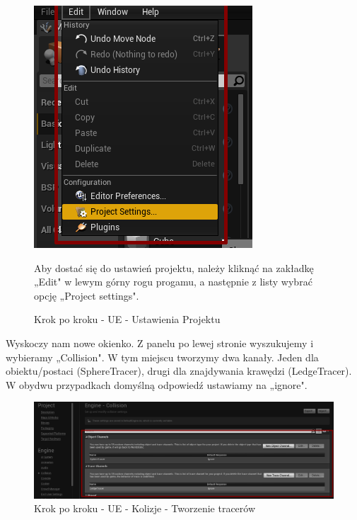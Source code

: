 \documentclass[openright]{xmgr}
\begin{document}
\begin{figure}[!htb]
    \begin{center}
    \includegraphics[scale=0.5]{Screeny/UeKrokPoKroku/UE-Climb-ProjectSettings.png}
    \end{center}
    \caption{Krok po kroku - UE - Ustawienia Projektu}
    Aby dostać się do ustawień projektu, należy kliknąć na zakładkę „Edit" w lewym górny rogu progamu, a następnie z listy wybrać opcję „Project settings".
\end{figure}

Wyskoczy nam nowe okienko. Z panelu po lewej stronie wyszukujemy i wybieramy „Collision". W tym miejscu tworzymy dwa kanały. Jeden dla obiektu/postaci (SphereTracer), drugi dla znajdywania krawędzi (LedgeTracer). W obydwu przypadkach domyślną odpowiedź ustawiamy na „ignore".

\begin{figure}[!htb]
    \begin{center}
    \includegraphics[scale=0.35]{Screeny/UeKrokPoKroku/UE-Climb-Collision.png}
    \end{center}
    \caption{Krok po kroku - UE -  Kolizje - Tworzenie tracerów}
\end{figure}
\end{document}
